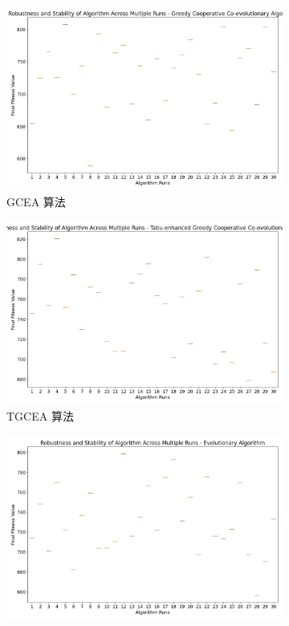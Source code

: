 \documentclass[12pt,a4paper,oneside]{ctexart}
\begin{document}
\begin{appendices}
	\begin{figure}[h!]
		\centering
		\begin{subfigure}{0.32\textwidth}
			\includegraphics[width=\textwidth]{fig/23.png}
			\caption{GCEA 算法}
		\end{subfigure}
		\begin{subfigure}{0.32\textwidth}
			\includegraphics[width=\textwidth]{fig/25.png}
			\caption{TGCEA 算法}
		\end{subfigure}
		\begin{subfigure}{0.32\textwidth}
			\includegraphics[width=\textwidth]{fig/20.png}

\end{subfigure}
\end{figure}
\end{appendices}
\end{document}
